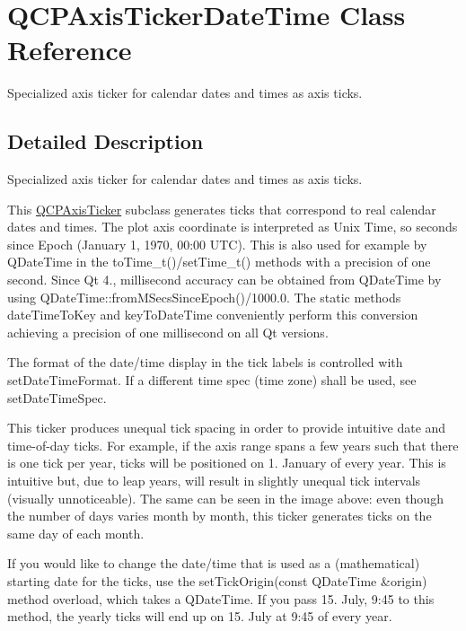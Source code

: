 \hypertarget{class_q_c_p_axis_ticker_date_time}{}\section{Q\+C\+P\+Axis\+Ticker\+Date\+Time Class Reference}
\label{class_q_c_p_axis_ticker_date_time}


Specialized axis ticker for calendar dates and times as axis ticks.  




\subsection{Detailed Description}
Specialized axis ticker for calendar dates and times as axis ticks. 



This \mbox{\hyperlink{class_q_c_p_axis_ticker}{Q\+C\+P\+Axis\+Ticker}} subclass generates ticks that correspond to real calendar dates and times. The plot axis coordinate is interpreted as Unix Time, so seconds since Epoch (January 1, 1970, 00\+:00 U\+TC). This is also used for example by Q\+Date\+Time in the {\ttfamily to\+Time\+\_\+t()/set\+Time\+\_\+t()} methods with a precision of one second. Since Qt 4., millisecond accuracy can be obtained from Q\+Date\+Time by using {\ttfamily Q\+Date\+Time\+::from\+M\+Secs\+Since\+Epoch()/1000.0}. The static methods date\+Time\+To\+Key and key\+To\+Date\+Time conveniently perform this conversion achieving a precision of one millisecond on all Qt versions.

The format of the date/time display in the tick labels is controlled with set\+Date\+Time\+Format. If a different time spec (time zone) shall be used, see set\+Date\+Time\+Spec.

This ticker produces unequal tick spacing in order to provide intuitive date and time-\/of-\/day ticks. For example, if the axis range spans a few years such that there is one tick per year, ticks will be positioned on 1. January of every year. This is intuitive but, due to leap years, will result in slightly unequal tick intervals (visually unnoticeable). The same can be seen in the image above\+: even though the number of days varies month by month, this ticker generates ticks on the same day of each month.

If you would like to change the date/time that is used as a (mathematical) starting date for the ticks, use the set\+Tick\+Origin(const Q\+Date\+Time \&origin) method overload, which takes a Q\+Date\+Time. If you pass 15. July, 9\+:45 to this method, the yearly ticks will end up on 15. July at 9\+:45 of every year.


